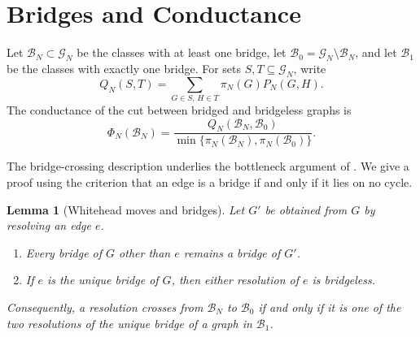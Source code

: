 \documentclass[11pt]{article}
\newcommand{\C}{\mathcal G}
\theoremstyle{plain}
\newtheorem{lemma}[lemma]{Lemma}
\theoremstyle{definition}
\numberwithin{equation}{section}
\begin{document}
\section{Bridges and Conductance}\label{sec:bridges}

Let $\mathcal B_N\subset\C_N$ be the classes with at least one bridge, let
$\mathcal B_0=\C_N\setminus\mathcal B_N$, and let $\mathcal B_1$ be the
classes with exactly one bridge.  For sets $S,T\subseteq\C_N$, write
\[
  Q_N(S,T)=\sum_{G\in S,\,H\in T}\pi_N(G)P_N(G,H).
\]
The conductance of the cut between bridged and bridgeless graphs is
\[
  \Phi_N(\mathcal B_N)=
  \frac{Q_N(\mathcal B_N,\mathcal B_0)}
       {\min\{\pi_N(\mathcal B_N),\pi_N(\mathcal B_0)\}}.
\]

The bridge-crossing description underlies the bottleneck argument of
\cite[Section~3]{GraveDePeraltaKolpakov2024}. We give a proof using
the criterion that an edge is a bridge if and only if it lies on no cycle.

\begin{lemma}[Whitehead moves and bridges]\label{lem:bridge-surgery}
Let $G'$ be obtained from $G$ by resolving an edge $e$.
\par\smallskip
\begin{enumerate}
\item Every bridge of $G$ other than $e$ remains a bridge of $G'$.
\item If $e$ is the unique bridge of $G$, then either resolution of $e$ is
bridgeless.
\end{enumerate}

Consequently, a resolution crosses from $\mathcal B_N$ to $\mathcal B_0$ if
and only if it is one of the two resolutions of the unique bridge of a graph
in $\mathcal B_1$.
\end{lemma}
\end{document}
